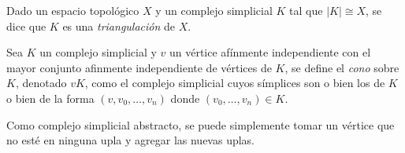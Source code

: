 \documentclass[HS.tex]{subfiles}
\begin{document}
\begin{defi}
Dado un espacio topológico $X$ y un complejo simplicial $K$ tal que $|K|\cong X$, se dice que $K$ es una \emph{triangulación} de $X$. 
\end{defi}

\begin{defi}
Sea $K$ un complejo simplicial y $v$ un vértice afínmente independiente con el mayor conjunto afinmente independiente de vértices de $K$, se define el \emph{cono} sobre $K$, denotado $vK$,  como el complejo simplicial cuyos símplices son o bien los de $K$ o bien de la forma $(v,v_0,\dots, v_n)$ donde $(v_0,\dots, v_n)\in K$. 
\end{defi}

\begin{nota}
Como complejo simplicial abstracto, se puede simplemente tomar un vértice que no esté en ninguna upla y agregar las nuevas uplas.
\end{nota}
\end{document}
